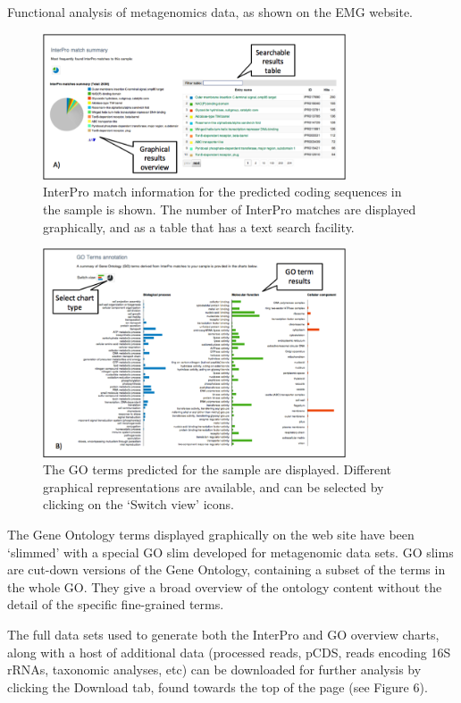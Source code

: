 Functional analysis of metagenomics data, as shown on the EMG website.

\begin{figure}[H]
\centering
\includegraphics[width=0.8\textwidth]{handout/FA_Interpro.png}
\caption{ InterPro match information for the predicted coding sequences in the sample is shown. The number of InterPro matches are displayed graphically, and as a table that has a text search facility.}
\label{fig:FA_Interpro}
\end{figure}

\begin{figure}[H]
\centering
\includegraphics[width=0.8\textwidth]{handout/FA_GO.png}
\caption{ The GO terms predicted for the sample are displayed. Different graphical representations are available, and can be selected by clicking on the ‘Switch view’ icons.}
\label{fig:FA_GO}
\end{figure}

The Gene Ontology terms displayed graphically on the web site have been ‘slimmed’ with a special GO slim developed for metagenomic data sets. GO slims are cut-down versions of the Gene Ontology, containing a subset of the terms in the whole GO. They give a broad overview of the ontology content without the detail of the specific fine-grained terms.

The full data sets used to generate both the InterPro and GO overview charts, along with a host of additional data (processed reads, pCDS, reads encoding 16S rRNAs, taxonomic analyses, etc) can be downloaded for further analysis by clicking the Download tab, found towards the top of the page (see Figure 6).

